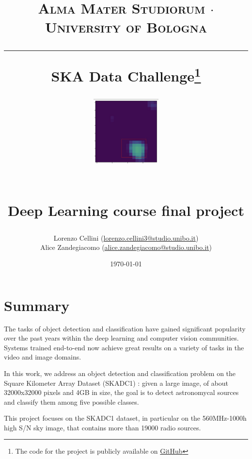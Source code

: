 \documentclass[a4paper,10pt]{report}
\begin{document}
\frenchspacing

\title{
  {{\large{\textsc{Alma Mater Studiorum $\cdot$ University of Bologna}}}}
  \rule{\textwidth}{0.4pt}\vspace{3mm}
  \textbf{SKA Data Challenge\footnote{The code for the project is publicly available on \href{https://github.com/Lorenz92/SKADC1}{GitHub}}}
  \begin{figure}[!htb]
    \centering
    \includegraphics[width = 100pt]{nice-detection.png}
  \end{figure} \\
  Deep Learning course final project
}

\author{Lorenzo Cellini (\href{mailto:lorenzo.cellini3@studio.unibo.it}{lorenzo.cellini3@studio.unibo.it}) \\ Alice Zandegiacomo (\href{mailto:alice.zandegiacomo@studio.unibo.it}{alice.zandegiacomo@studio.unibo.it})}
\date{\today}
\maketitle
\newpage
\tableofcontents
\setcounter{tocdepth}{1}
\newpage


\chapter{Summary}\label{chap:introduction}

The tasks of object detection and classification have gained significant popularity over the past years within the deep learning and computer vision communities. Systems trained end-to-end now achieve great results on a variety of tasks in the video and image domains.

In this work, we address an object detection and classification problem on the Square Kilometer Array Dataset (SKADC1) \cite{ska-site}: given a large image, of about 32000x32000 pixels and 4GB in size, the goal is to detect astronomycal sources and classify them among five possible classes.

This project focuses on the SKADC1 dataset, in particular on the 560MHz-1000h high S/N sky image, that contains more than \num{19000} radio sources.
\end{document}
